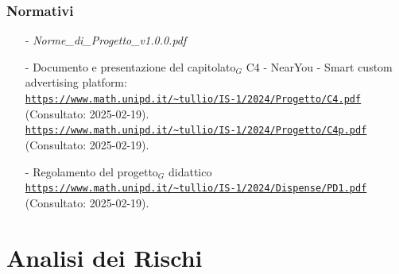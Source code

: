 \documentclass[10pt]{article}
\begin{document}
\subsubsection{Normativi}
\begin{itemize}
\item [-] \textit{Norme\_di\_Progetto\_v1.0.0.pdf}
    \item [-] Documento e presentazione del capitolato$_G$ C4 - NearYou - Smart custom advertising platform:\\
    \textcolor{blue}{\texttt{\url{https://www.math.unipd.it/~tullio/IS-1/2024/Progetto/C4.pdf}}}\\
(Consultato: 2025-02-19).\\
\textcolor{blue}{\texttt{\url{https://www.math.unipd.it/~tullio/IS-1/2024/Progetto/C4p.pdf}}}\\
(Consultato: 2025-02-19).
    
\item [-] Regolamento del progetto$_G$ didattico\\ \textcolor{blue}{\texttt{\url{https://www.math.unipd.it/~tullio/IS-1/2024/Dispense/PD1.pdf}}}\\
(Consultato: 2025-02-19).
\end{itemize}

\newpage
\section{Analisi dei Rischi}
\label{analisi-rischi}
\end{document}
